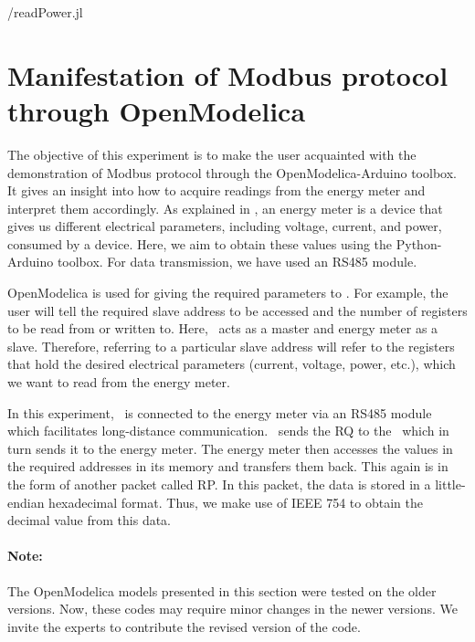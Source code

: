 \begin{juliacode}
  \label{julia:modbus-power}
  
  {\LocMODjuliacode/readPower.jl}
\end{juliacode}


\section{Manifestation of Modbus protocol through OpenModelica}
The objective of this experiment is to make the user acquainted with
the demonstration of Modbus protocol through the OpenModelica-Arduino toolbox. 
It gives an insight into how to acquire readings from the energy meter and interpret them accordingly. As explained in , 
an energy meter is a device that gives us different electrical parameters, including voltage, current, and power, consumed by a device. Here, we aim to obtain these values using the Python-Arduino toolbox. For data transmission, we have used an RS485 module.

OpenModelica is used for giving the required parameters to \arduino. For
example, the user will tell the required slave address to be accessed
and the number of registers to be read from or written to. Here,
\arduino\ acts as a master and energy meter as a slave. Therefore,
referring to a particular slave address will refer to the registers
that hold the desired electrical parameters (current, voltage, power, etc.), which we want to read from the energy meter.

In this experiment, \arduino\ is connected to the energy meter via an RS485 module which facilitates long-distance communication. 
\scilab\ sends the RQ to the \arduino\, which in turn sends it to the
energy meter. The energy meter then accesses the values in the
required addresses in its memory and transfers them back. This again
is in the form of another packet called RP. In this packet, the data is stored in a little-endian hexadecimal format. Thus, we make use of IEEE 754 to obtain the decimal value from this data. 

\paragraph{Note: } The OpenModelica models presented in this section were tested on the older versions. Now, these codes may require minor changes in
the newer versions. We invite the experts to contribute the revised version of the code.


